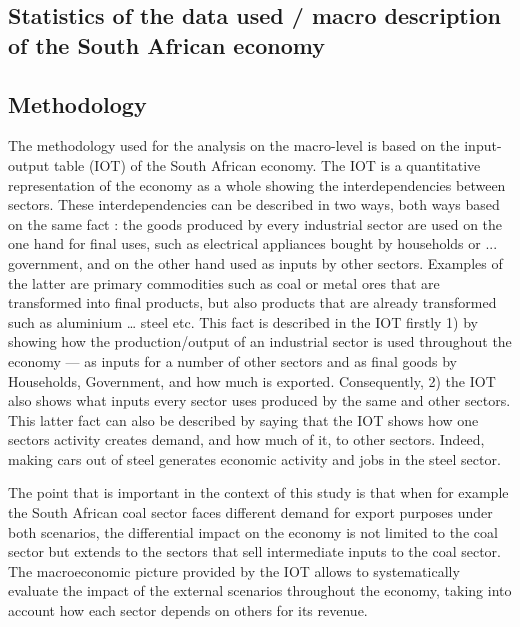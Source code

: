 \documentclass[12pt,english]{article}
\begin{document}
\subsection{Statistics of the data used / macro description of the South African economy}

\subsection{Methodology}

The methodology used for the analysis on the macro-level is based on the input-output table (IOT) of the South African economy. The IOT is a quantitative representation of the economy as a whole showing the interdependencies between sectors. These interdependencies can be described in two ways, both ways based on the same fact : the goods produced by every industrial sector are used on the one hand for final uses, such as electrical appliances bought by households or ... government, and on the other hand used as inputs by other sectors. Examples of the latter are primary commodities such as coal or metal ores that are transformed into final products, but also products that are already transformed such as aluminium \ldots{} steel etc. This fact is described in the IOT firstly 1) by showing how the production/output of an industrial sector is used throughout the economy --- as inputs for a number of other sectors and as final goods by Households, Government, and how much is exported. Consequently, 2) the IOT also shows what inputs every sector uses produced by the same and other sectors. This latter fact can also be described by saying that the IOT shows how one sectors activity creates demand, and how much of it, to other sectors. Indeed, making cars out of steel generates economic activity and jobs in the steel sector. 

The point that is important in the context of this study %
is that when for example the South African coal sector faces different demand for export purposes under both scenarios, the differential impact on the economy is not limited to the coal sector but extends to the sectors that sell intermediate inputs to the coal sector. The macroeconomic picture provided by the IOT allows to systematically evaluate the impact of the external scenarios throughout the economy, taking into account how each sector depends on others for its revenue. %
\end{document}
